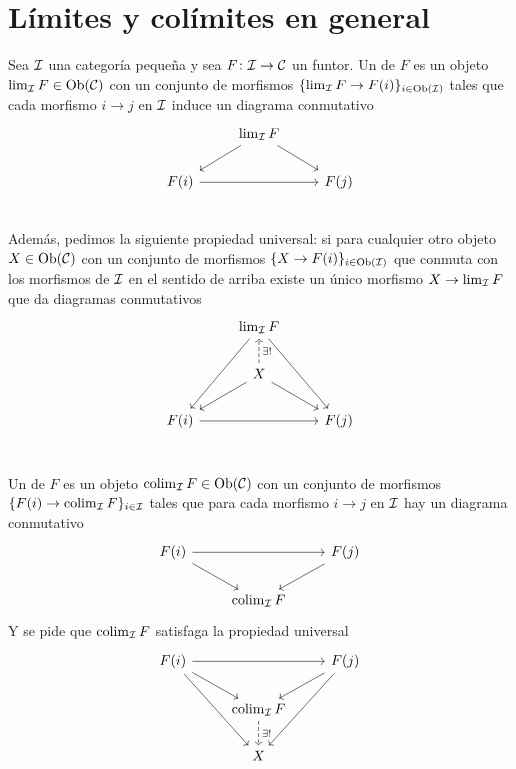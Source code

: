 \documentclass{article}
\numberwithin{equation}{section}
\theoremstyle{definition}
\begin{document}

\section{Límites y colímites en general}


\begin{definicion}
  Sea $\mathcal{I}$ una categoría pequeña y sea
  $F\colon \mathcal{I} \to \mathcal{C}$ un funtor. Un  de $F$ es un
  objeto $\lim_\mathcal{I} F \in \operatorname{Ob} (\mathcal{C})$ con un conjunto de morfismos
  $\{ \lim_\mathcal{I} F \to F (i) \}_{i\in \operatorname{Ob} (\mathcal{I})}$ tales que cada
  morfismo $i\to j$ en $\mathcal{I}$ induce un diagrama conmutativo
  $$\begin{tikzcd}
    & \lim_\vcateg{I} F\ar{dl}\ar{dr}\\
    F (i)\ar{rr} & & F (j) \\
  \end{tikzcd}$$
  Además, pedimos la siguiente propiedad universal: si para cualquier otro
  objeto $X\in \operatorname{Ob} (\mathcal{C})$ con un conjunto de morfismos
  $\{ X \to F (i) \}_{i\in \operatorname{Ob} (\mathcal{I})}$ que conmuta con los morfismos de
  $\mathcal{I}$ en el sentido de arriba existe un único morfismo
  $X \to \lim_\mathcal{I} F$ que da diagramas conmutativos
  $$\begin{tikzcd}
    & \lim_\vcateg{I} F\ar{ddl}\ar{ddr} \\
    & X\ar{dl}\ar{dr}\ar[dashed]{u}[swap]{\exists !} \\
    F (i)\ar{rr} & & F (j) \\
  \end{tikzcd}$$

  Un  de $F$ es un objeto
  $\operatorname*{co{\lim}}_\mathcal{I} F \in \operatorname{Ob} (\mathcal{C})$ con un conjunto de morfismos
  $\{ F(i) \to \operatorname*{co{\lim}}_\mathcal{I} F \}_{i\in \mathcal{I}}$ tales que para cada
  morfismo $i\to j$ en $\mathcal{I}$ hay un diagrama conmutativo
  $$\begin{tikzcd}
    F (i)\ar{rr}\ar{dr} & & F (j)\ar{dl} \\
    & \colim_\vcateg{I} F
  \end{tikzcd}$$
  Y se pide que $\operatorname*{co{\lim}}_\mathcal{I} F$ satisfaga la propiedad universal
  $$\begin{tikzcd}
    F (i)\ar{rr}\ar{dr}\ar{ddr} & & F (j)\ar{dl}\ar{ddl} \\
    & \colim_\vcateg{I} F\ar[dashed]{d}{\exists !}\\
    & X
  \end{tikzcd}$$
\end{definicion}
\end{document}

